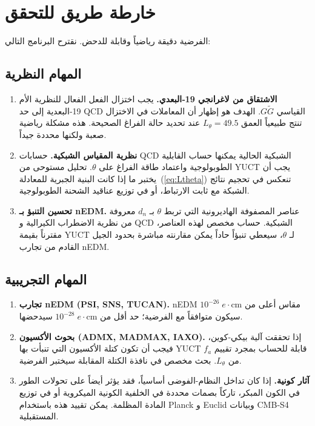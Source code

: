 \documentclass[12pt,a4paper]{article}
\begin{document}
	\section{خارطة طريق للتحقق}
	\label{sec:roadmap}
	
	الفرضية دقيقة رياضياً وقابلة للدحض. نقترح البرنامج التالي:
	
	\subsection{المهام النظرية}
	\begin{enumerate}
		\item \textbf{الاشتقاق من لاغرانجي 19‑البعدي.}
		يجب اختزال الفعل الفعال للنظرية الأم 19‑البعدية إلى حد QCD القياسي \(G\widetilde{G}\). الهدف هو إظهار أن المعاملات في الاختزال تنتج طبيعياً العمق \(L_\theta = 49.5\) عند تحديد حالة الفراغ الصحيحة. هذه مشكلة رياضية صعبة ولكنها محددة جيداً.
		\item \textbf{نظرية المقياس الشبكية.}
		حسابات QCD الشبكية الحالية يمكنها حساب القابلية الطوبولوجية واعتماد طاقة الفراغ على \(\theta\). تحليل مستوحى من YUCT يجب أن يختبر ما إذا كانت البنية الجبرية للمعادلة~(\ref{eq:Ltheta}) تنعكس في تحجيم نتائج الشبكة مع ثابت الارتباط، أو في توزيع عناقيد الشحنة الطوبولوجية.
		\item \textbf{تحسين التنبؤ بـ nEDM.}
		عناصر المصفوفة الهاديرونية التي تربط \(\theta\) بـ \(d_n\) معروفة من نظرية الاضطراب الكيرالية و QCD الشبكية. حساب مخصص لهذه العناصر، مقترناً بقيمة YUCT لـ \(\theta\)، سيعطي تنبؤاً حاداً يمكن مقارنته مباشرة بحدود الجيل القادم من تجارب nEDM.
	\end{enumerate}
	
	\subsection{المهام التجريبية}
	\begin{enumerate}
		\item \textbf{تجارب nEDM (PSI, SNS, TUCAN).}
		nEDM مقاس أعلى من \(10^{-26}\;e\!\cdot\!\mathrm{cm}\) سيكون متوافقاً مع الفرضية؛ حد أقل من \(10^{-28}\;e\!\cdot\!\mathrm{cm}\) سيدحضها.
		\item \textbf{بحوث الأكسيون (ADMX, MADMAX, IAXO).}
		إذا تحققت آلية بيكي-كوين، فيجب أن تكون كتلة الأكسيون التي تنبأت بها YUCT قابلة للحساب بمجرد تقييم \(f_a\) من \(L_\theta\). بحث مخصص في نافذة الكتلة المقابلة سيختبر الفرضية.
		\item \textbf{آثار كونية.}
		إذا كان تداخل النظام-الفوضى أساسياً، فقد يؤثر أيضاً على تحولات الطور في الكون المبكر، تاركاً بصمات محددة في الخلفية الكونية الميكروية أو في توزيع المادة المظلمة. يمكن تقييد هذه باستخدام Planck و Euclid وبيانات CMB‑S4 المستقبلية.
	\end{enumerate}
	
\end{document}
